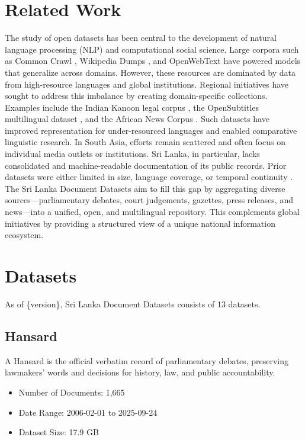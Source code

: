 \documentclass[10pt,a4paper]{article}%
\begin{document}
%
\section{Related Work}%
\label{sec:RelatedWork}%
The study of open datasets has been central to the development of natural language processing (NLP) and computational social science. Large corpora such as Common Crawl%
\cite{commoncrawl2020}%
, Wikipedia Dumps%
\cite{wikidumps2018}%
, and OpenWebText%
\cite{openwebtext2019}%
have powered models that generalize across domains. However, these resources are dominated by data from high{-}resource languages and global institutions.%
\newline%
\newline%
Regional initiatives have sought to address this imbalance by creating domain{-}specific collections. Examples include the Indian Kanoon legal corpus%
\cite{indiankanoon2018}%
, the OpenSubtitles multilingual dataset%
\cite{opensubtitles2016}%
, and the African News Corpus%
\cite{africannews2021}%
. Such datasets have improved representation for under{-}resourced languages and enabled comparative linguistic research.%
\newline%
\newline%
In South Asia, efforts remain scattered and often focus on individual media outlets or institutions. Sri Lanka, in particular, lacks consolidated and machine{-}readable documentation of its public records. Prior datasets were either limited in size, language coverage, or temporal continuity%
\cite{sltalk2023}%
%
\cite{srilankanlp2022}%
.%
\newline%
\newline%
The Sri Lanka Document Datasets aim to fill this gap by aggregating diverse sources—parliamentary debates, court judgements, gazettes, press releases, and news—into a unified, open, and multilingual repository. This complements global initiatives by providing a structured view of a unique national information ecosystem.%
\newline%
\newline

%
\section{Datasets}%
\label{sec:Datasets}%
As of \{version\}, Sri Lanka Document Datasets consists of 13 datasets.%
\subsection{Hansard}%
\label{subsec:Hansard}%
A Hansard is the official verbatim record of parliamentary debates, preserving lawmakers’ words and decisions for history, law, and public accountability.%
\begin{itemize}%
\item%
Number of Documents: 1,665%
\item%
Date Range: 2006{-}02{-}01 to 2025{-}09{-}24%
\item%
Dataset Size: 17.9 GB%
\end{itemize}
\end{document}
